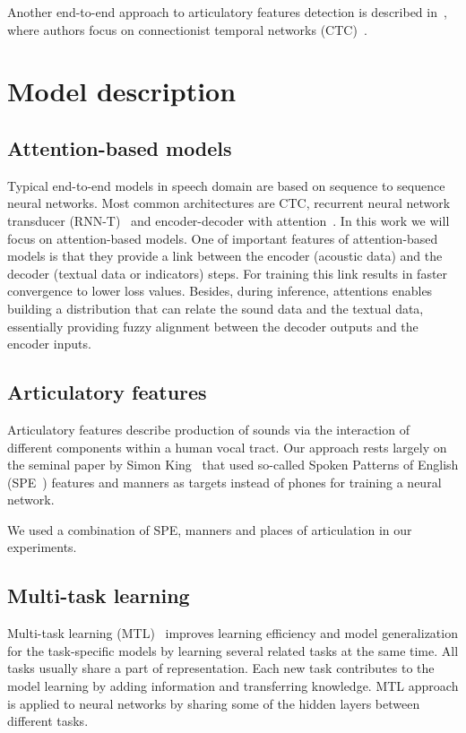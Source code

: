 \documentclass[a4paper]{article}
\begin{document}
Another end-to-end approach to articulatory features detection is described in~\cite{Qu-2018}, where authors focus on connectionist temporal networks (CTC)~\cite{Graves2006}.

\section{Model description}
\subsection{Attention-based models}
Typical end-to-end models in speech domain are based on sequence to sequence neural networks. Most common architectures are CTC, recurrent neural network transducer (RNN-T)~\cite{Graves2013} and encoder-decoder with attention~\cite{Chorowski-Att-2015}. In this work we will focus on attention-based models. One of important features of attention-based models is that they provide a link between the encoder (acoustic data) and the decoder (textual data or indicators) steps. For training this link results in faster convergence to lower loss values. Besides, during inference, attentions enables building a distribution that can relate the sound data and the textual data, essentially providing fuzzy alignment between the decoder outputs and the encoder inputs.

\subsection{Articulatory features}
Articulatory features describe production of sounds via the interaction of different components within a human vocal tract.
Our approach rests largely on the seminal paper by Simon King~\cite{King-2000} that used so-called Spoken Patterns of English (SPE~\cite{Chomsky-Halle-1968}) features and manners as targets instead of phones for training a neural network.

We used a combination of SPE, manners and places of articulation in our experiments.

\subsection{Multi-task learning}
Multi-task learning (MTL)~\cite{Caruana98} improves learning efficiency and model generalization for the task-specific models by learning several related tasks at the same time. All tasks usually share a part of representation. Each new task contributes to the model learning by adding information and transferring knowledge. MTL approach is applied to neural networks by sharing some of the hidden layers between different tasks.
\end{document}

